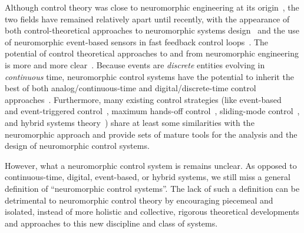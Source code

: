 \documentclass{article}
\theoremstyle{definition}
\theoremstyle{remark}
\begin{document}
Although control theory was close to neuromorphic engineering at its origin~\cite{de1990neuron}, the two fields have remained relatively apart until recently, with the appearance of both control-theoretical approaches to neuromorphic systems design~\cite{castanos2017implementing,ribar2021} and the use of neuromorphic event-based sensors in fast feedback control loops~\cite{singh2018regulation}. The potential of control theoretical approaches to and from neuromorphic engineering is more and more clear~\cite{sepulchre2019control,petri2024analysis,huijzer2025modelling,shahhosseini2024operator,schmetterling2024,che2023dominant,juarez2025collective,cathcart2024spiking}. Because events are {\it discrete} entities evolving in {\it continuous} time, neuromorphic control systems have the potential to inherit the best of both analog/continuous-time and digital/discrete-time control approaches~\cite{sepulchre2022spiking,sepulchre2019control}. Furthermore, many existing control strategies (like event-based~\cite{astrom2008event} and event-triggered control~\cite{heemels2012introduction}, maximum hands-off control~\cite{nagahara2016}, sliding-mode control~\cite{shtessel2014sliding}, and hybrid systems theory~\cite{goebel}) share at least some similarities with the neuromorphic approach and provide sets of mature tools for the analysis and the design of neuromorphic control systems. 

However, what a neuromorphic control system is remains unclear. As opposed to continuous-time, digital, event-based, or hybrid systems, we still miss a general definition of ``neuromorphic control systems''. The lack of such a definition can be detrimental to neuromorphic control theory by encouraging piecemeal and isolated, instead of more holistic and collective, rigorous theoretical developments and approaches to this new discipline and class of systems.
\end{document}
